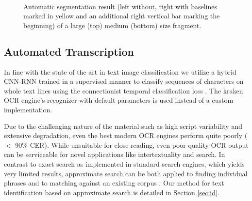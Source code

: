 \begin{figure}[t]
	\\ 

	\caption{Automatic segmentation result (left without, right with
	baselines marked in yellow and an additional right vertical bar marking
	the beginning) of a large (top) medium (bottom) size fragment.}
\vspace*{-5mm} \label{fig:baselinesegm} \end{figure}

\subsection{Automated Transcription}

In line with the state of the art in text image classification we utilize a
hybrid CNN-RNN trained in a supervised manner to classify sequences of
characters on whole text lines using the connectionist temporal classification
loss \cite{graves2006connectionist}. The kraken OCR engine's recognizer with
default parameters is used instead of a custom implementation.

Due to the challenging nature of the material such as high script variability
and extensive degradation, even the best modern OCR engines perform quite
poorly ($<$ 90\% CER). While unsuitable for close reading, even poor-quality
OCR output can be serviceable for novel applications like intertextuality and
search.  In contrast to exact search as implemented in standard search engines,
which yields very limited results, approximate search can be both applied to
finding individual phrases \cite{approx,Wiener} and to matching against an
existing corpus \cite{Zh}.  Our method for text identification based on
approximate search is detailed in Section \ref{sec:id}.

